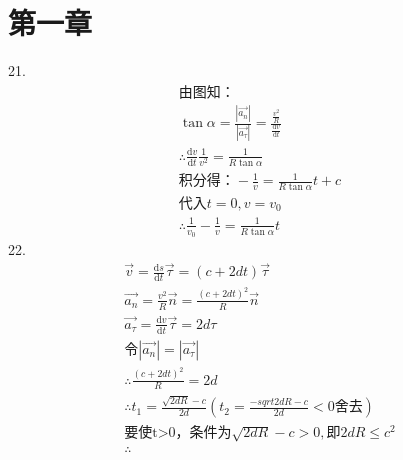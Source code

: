 \documentclass[blue]{./templete/qyxfnote}
\newcommand{\di}[1]{\mathrm{d}#1}
\newcommand{\dy}[2]{\frac{\di{#1}}{\di{#2}}}
\begin{document}
	\section*{第一章}
		21.
		\begin{gather*}
			\text{由图知：}\\
			\tan\alpha=\frac{|\vec{a_n}|}{|\vec{a_\tau}|}=\frac{\frac{v^2}{R}}{\dy{v}{t}}\\
			\therefore \dy{v}{t}\frac{1}{v^2}=\frac{1}{R\tan\alpha}\\
			\text{积分得：}-\frac{1}{v}=\frac{1}{R\tan\alpha}t+c\\
			\text{代入}t=0,v=v_0\\
			\therefore \frac{1}{v_0}-\frac{1}{v}=\frac{1}{R\tan\alpha}t
		\end{gather*}
		22.
		\begin{gather*}
			\vec{v}=\dy{s}{t}\vec{\tau}=(c+2dt)\vec{\tau}\\  
			\vec{a_n}=\frac{v^2}{R}\vec{n}=\frac{(c+2dt)^2}{R}\vec{n}\\
			\vec{a_\tau}=\dy{v}{t}\vec{\tau}=2d\tau\\
			\text{令}|\vec{a_n}|=|\vec{a_\tau}|\\
			\therefore \frac{(c+2dt)^2}{R}=2d\\
			\therefore t_1=\frac{\sqrt{2dR}-c}{2d}\left(t_2=\frac{-sqrt{2dR}-c}{2d}<0舍去\right)\\
			\text{要使t>0，条件为}\sqrt{2dR}-c>0,\text{即}2dR\leqslant c^2\\
			\therefore 
		\end{gather*}
\end{document}
